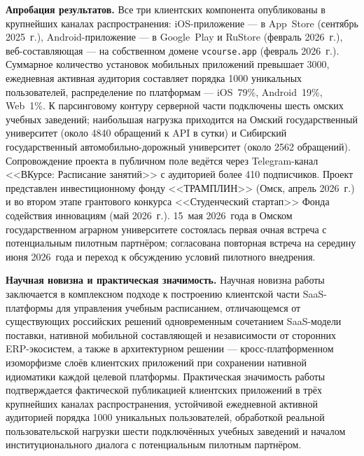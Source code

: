 \textbf{Апробация результатов.} Все три клиентских компонента опубликованы в крупнейших каналах распространения: iOS-приложение --- в App~Store (сентябрь 2025~г.), Android-приложение --- в Google~Play и RuStore (февраль 2026~г.), веб-составляющая --- на собственном домене \texttt{vcourse.app} (февраль 2026~г.). Суммарное количество установок мобильных приложений превышает 3000, ежедневная активная аудитория составляет порядка 1000 уникальных пользователей, распределение по платформам --- iOS~79\%, Android~19\%, Web~1\%. К парсинговому контуру серверной части подключены шесть омских учебных заведений; наибольшая нагрузка приходится на Омский государственный университет (около 4840 обращений к API в сутки) и Сибирский государственный автомобильно-дорожный университет (около 2562 обращений). Сопровождение проекта в публичном поле ведётся через Telegram-канал <<ВКурсе: Расписание занятий>> с аудиторией более 410 подписчиков. Проект представлен инвестиционному фонду <<ТРАМПЛИН>> (Омск, апрель 2026~г.) и во втором этапе грантового конкурса <<Студенческий стартап>> Фонда содействия инновациям (май 2026~г.). 15~мая 2026~года в Омском государственном аграрном университете состоялась первая очная встреча с потенциальным пилотным партнёром; согласована повторная встреча на середину июня 2026~года и переход к обсуждению условий пилотного внедрения.

\textbf{Научная новизна и практическая значимость.} Научная новизна работы заключается в комплексном подходе к построению клиентской части SaaS-платформы для управления учебным расписанием, отличающемся от существующих российских решений одновременным сочетанием SaaS-модели поставки, нативной мобильной составляющей и независимости от сторонних ERP-экосистем, а также в архитектурном решении --- кросс-платформенном изоморфизме слоёв клиентских приложений при сохранении нативной идиоматики каждой целевой платформы. Практическая значимость работы подтверждается фактической публикацией клиентских приложений в трёх крупнейших каналах распространения, устойчивой ежедневной активной аудиторией порядка 1000 уникальных пользователей, обработкой реальной пользовательской нагрузки шести подключённых учебных заведений и началом институционального диалога с потенциальным пилотным партнёром.

